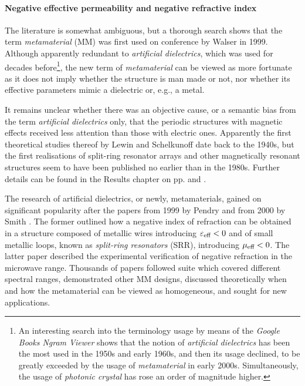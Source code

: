 \paragraph{Negative effective permeability and negative refractive index}  %
The literature is somewhat ambiguous, but a thorough search shows that the term \textit{metamaterial} (MM) was first used on conference by Walser in 1999. Although apparently redundant to \textit{artificial dielectrics}, which was used for decades before\footnote{An interesting search into the terminology usage by means of the \textit{Google Books Ngram Viewer} shows that the notion of  \textit{artificial dielectrics} has been the most used in the 1950s and early 1960s, and then its usage declined, to be greatly exceeded by the usage of \textit{metamaterial} in early 2000s. Simultaneously, the usage of \textit{photonic crystal} has rose an order of magnitude higher.},  the new term of \textit{metamaterial} can be viewed as more fortunate as it does not imply whether the structure is man made or not, nor whether its effective parameters mimic a dielectric or, e.g., a metal.

It remains unclear whether there was an objective cause, or a semantic bias from the term \textit{artificial dielectrics} only, that the periodic structures with magnetic effects received less attention than those with electric ones. Apparently the first theoretical studies thereof by Lewin \cite{lewin1947electrical} and Schelkunoff \cite{schelkunoff1952antennas} date back to the 1940s, but the first realisations of split-ring resonator arrays and other magnetically resonant structures seem to have been published no earlier than in the 1980s. Further details can be found in the Results chapter on pp. \pageref{negn_srr} and \pageref{negn_diel}.

The research of artificial dielectrics, or newly, metamaterials, gained on significant popularity after the papers from 1999 by Pendry \cite{pendry1999magnetism} and from 2000 by Smith \cite{smith2000composite}. The former outlined how a negative index of refraction can be obtained in a structure composed of metallic wires introducing $\varepsilon_{\text{eff} }<0$ and of small metallic loops, known as \textit{split-ring resonators} (SRR), introducing $\mu_{\text{eff} }<0$. The latter paper described the experimental verification of negative refraction in the microwave range. Thousands of papers followed suite which covered different spectral ranges, demonstrated other MM designs, discussed theoretically when and how the metamaterial can be viewed as homogeneous, and sought for new applications. 

